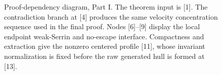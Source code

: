 \documentclass[11pt]{amsart}
\theoremstyle{plain}
\theoremstyle{definition}
\theoremstyle{remark}
\numberwithin{equation}{section}
\begin{document}
\begin{figure}[p]
{%
}
\caption[Proof-dependency diagram, Part I]{Proof-dependency diagram, Part I.
The theorem input is [1].  The contradiction branch at [4] produces the same
velocity concentration sequence used in the final proof.  Nodes [6]--[9]
display the local endpoint weak-Serrin and no-escape interface.  Compactness
and extraction give the nonzero centered profile [11], whose invariant
normalization is fixed before the raw generated hull is formed at [13].}
\label{fig:local-typeI-proof-flow-entry}
\end{figure}
\end{document}
